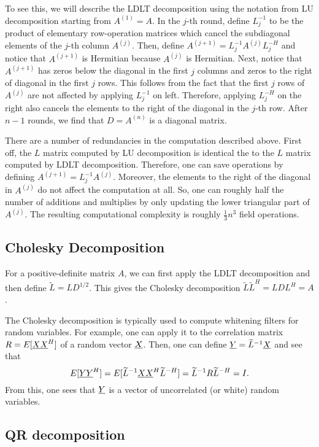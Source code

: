 To see this, we will describe the LDLT decomposition using the notation from LU decomposition starting from $A^{(1)} = A$.
In the $j$-th round, define $L_j^{-1}$ to be the product of elementary row-operation matrices which cancel the subdiagonal elements of the $j$-th column $A^{(j)}$.
Then, define $A^{(j+1)} = L_j^{-1} A^{(j)} L_j^{-H}$ and notice that $A^{(j+1)}$ is Hermitian because $A^{(j)}$ is Hermitian.
Next, notice that $A^{(j+1)}$ has zeros below the diagonal in the first $j$ columns and zeros to the right of diagonal in the first $j$ rows.
This follows from the fact that the first $j$ rows of $A^{(j)}$ are not affected by applying $L_j^{-1}$ on left.
Therefore, applying $L_j^{-H}$ on the right also cancels the elements to the right of the diagonal in the $j$-th row.
After $n-1$ rounds, we find that $D = A^{(n)}$ is a diagonal matrix.

There are a number of redundancies in the computation described above.
First off, the $L$ matrix computed by LU decomposition is identical the to the $L$ matrix computed by LDLT decomposition.
Therefore, one can save operations by defining $A^{(j+1)} = L_j^{-1} A^{(j)}$.
Moreover, the elements to the right of the diagonal in $A^{(j)}$ do not affect the computation at all.
So, one can roughly half the number of additions and multiplies by only updating the lower triangular part of $A^{(j)}$.
The resulting computational complexity is roughly $\frac{1}{3}n^3$ field operations.

\subsection{Cholesky Decomposition}

For a positive-definite matrix $A$, we can first apply the LDLT decomposition and then define $\widetilde{L} = L D^{1/2}$.
This gives the Cholesky decomposition $\widetilde{L} \widetilde{L}^H = L D L^H = A$.

The Cholesky decomposition is typically used to compute whitening filters for random variables.
For example, one can apply it to the correlation matrix $R = E [ \underline{X} \underline{X}^H ]$ of a random vector $\underline{X}$.
Then, one can define $\underline{Y} = \widetilde{L}^{-1} \underline{X}$ and see that
\[ E [ \underline{Y} \underline{Y}^H ] =  E [ \widetilde{L}^{-1} \underline{X} \underline{X}^H \widetilde{L}^{-H}] = \widetilde{L}^{-1} R \widetilde{L}^{-H} = I. \]
From this, one sees that $\underline{Y}$ is a vector of uncorrelated (or white) random variables.

\subsection{QR decomposition}

